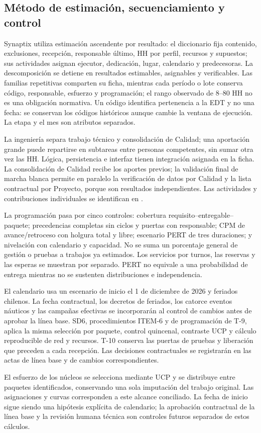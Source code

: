 \subsection{Método de estimación, secuenciamiento y control}
Synaptix utiliza estimación ascendente por resultado: el diccionario fija contenido, exclusiones, recepción, responsable último, HH por perfil, recursos y supuestos; sus actividades asignan ejecutor, dedicación, lugar, calendario y predecesoras. La descomposición se detiene en resultados estimables, asignables y verificables. Las familias repetitivas comparten su ficha, mientras cada período o lote conserva código, responsable, esfuerzo y programación; el rango observado de 8--80 HH no es una obligación normativa. Un código identifica pertenencia a la EDT y no una fecha: se conservan los códigos históricos aunque cambie la ventana de ejecución. La etapa y el mes son atributos separados.

La ingeniería separa trabajo técnico y consolidación de Calidad; una aportación grande puede repartirse en subtareas entre personas competentes, sin sumar otra vez las HH. Lógica, persistencia e interfaz tienen integración asignada en la ficha. La consolidación de Calidad recibe los aportes previos; la validación final de marcha blanca permite en paralelo la verificación de datos por Calidad y la lista contractual por Proyecto, porque son resultados independientes. Las actividades y contribuciones individuales se identifican en .

La programación pasa por cinco controles: cobertura requisito--entregable--paquete; precedencias completas sin ciclos y puertas con responsable; CPM de avance/retroceso con holgura total y libre; escenario PERT de tres duraciones; y nivelación con calendario y capacidad. No se suma un porcentaje general de gestión o pruebas a trabajos ya estimados. Los servicios por turnos, las reservas y las esperas se muestran por separado. PERT no equivale a una probabilidad de entrega mientras no se sustenten distribuciones e independencia.

El calendario usa un escenario de inicio el 1 de diciembre de 2026 y feriados chilenos. La fecha contractual, los decretos de feriados, los catorce eventos náuticos y las campañas efectivas se incorporarán al control de cambios antes de aprobar la línea base. SD6, procedimientos ITEM-6 y de programación de T-9, aplica la misma selección por paquete, control quincenal, contraste UCP y cálculo reproducible de red y recursos. T-10 conserva las puertas de pruebas y liberación que preceden a cada recepción. Las decisiones contractuales se registrarán en las actas de línea base y de cambios correspondientes.


El esfuerzo de los núcleos se selecciona mediante UCP y se distribuye entre paquetes identificados, conservando una sola imputación del trabajo original. Las asignaciones y curvas corresponden a este alcance conciliado. La fecha de inicio sigue siendo una hipótesis explícita de calendario; la aprobación contractual de la línea base y la revisión humana técnica son controles futuros separados de estos cálculos.
